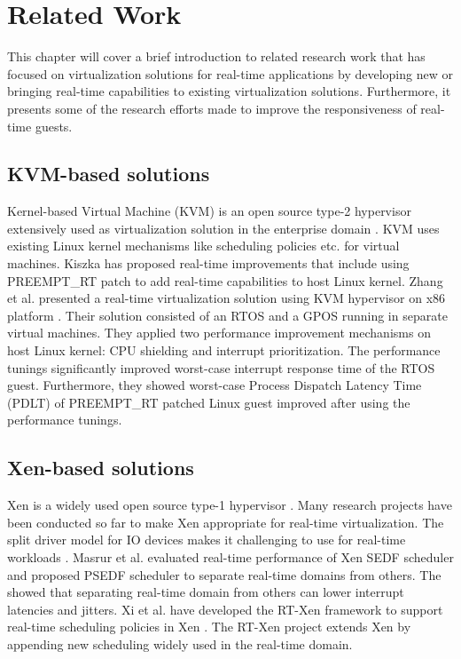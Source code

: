 \chapter{Related Work\label{chap5}}


This chapter will cover a brief introduction to related research work that has focused on virtualization solutions
for real-time applications by developing new or bringing real-time capabilities to existing virtualization
solutions. Furthermore, it presents some of the research efforts made to improve the responsiveness of real-time guests.

\section{KVM-based solutions}
Kernel-based Virtual Machine (KVM) is an open source type-2 hypervisor extensively used as virtualization solution in the enterprise domain \cite{kivity2007kvm}.
KVM uses existing Linux kernel mechanisms like scheduling policies etc. for virtual machines. 
Kiszka \cite{kiszka2009towards} has proposed real-time improvements that include using PREEMPT\_RT patch \cite{PREEMPT-RT} 
to add real-time capabilities to host Linux kernel.
Zhang et al. presented a real-time virtualization solution using KVM hypervisor on x86 platform \cite{zuo2010performance}.
Their solution consisted of an RTOS and a GPOS running in separate virtual machines. 
They applied two performance improvement mechanisms on host Linux kernel: CPU shielding and interrupt prioritization.
The performance tunings significantly improved worst-case interrupt response time of the RTOS guest.
Furthermore, they showed worst-case Process Dispatch Latency Time (PDLT) of PREEMPT\_RT patched Linux guest improved after using the performance tunings.

\section{Xen-based solutions}
Xen is a widely used open source type-1 hypervisor \cite{Barham:2003:XAV:1165389.945462}. 
Many research projects have been conducted so far to make Xen appropriate for real-time virtualization.
The split driver model for IO devices makes it challenging to use for real-time workloads \cite{Yoo:2011:TUI:2103799.2103816}.
Masrur et al. \cite{masrur2010vm} evaluated real-time performance of Xen SEDF scheduler and proposed PSEDF scheduler to separate
real-time domains from others. The showed that separating real-time domain from others can lower interrupt latencies and jitters.
Xi et al. have developed the RT-Xen framework to support real-time scheduling policies in Xen \cite{Xi:2011:RTR:2038642.2038651}.
The RT-Xen project extends Xen by appending new scheduling widely used in the real-time domain.

